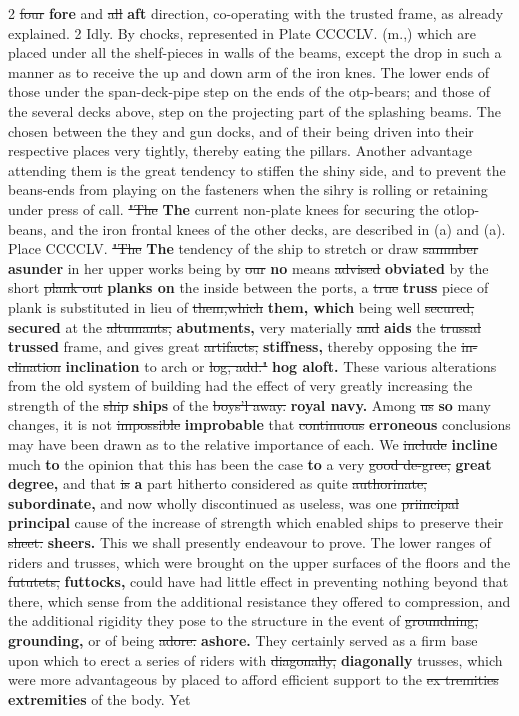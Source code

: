 \documentclass[10pt]{article}
\begin{document}
\begin{multicols}{2}
\sout{four} \textbf{fore} and \sout{all} \textbf{aft} direction, co-operating with the trusted frame, as already explained. 2 Idly. By chocks, represented in Plate CCCCLV. (m.,) which are placed under all the shelf-pieces in walls of the beams, except the drop in such a manner as to receive the up and down arm of the iron knes. The lower ends of those under the span-deck-pipe step on the ends of the otp-bears; and those of the several decks above, step on the projecting part of the splashing beams. The chosen between the they and gun docks, and of their being driven into their respective places very tightly, thereby eating the pillars. Another advantage attending them is the great tendency to stiffen the shiny side, and to prevent the beans-ends from playing on the fasteners when the sihry is rolling or retaining under press of call. \sout{"The} \textbf{The} current non-plate knees for securing the otlop-beans, and the iron frontal knees of the other decks, are described in (a) and (a). Place CCCCLV. \sout{"The} \textbf{The} tendency of the ship to stretch or draw \sout{sammber} \textbf{asunder} in her upper works being by \sout{our} \textbf{no} means \sout{advised} \textbf{obviated} by the short \sout{plank out} \textbf{planks on} the inside between the ports, a \sout{true} \textbf{truss} piece of plank is substituted in lieu of \sout{them,which} \textbf{them, which} being well \sout{secured,} \textbf{secured} at the \sout{altumants,} \textbf{abutments,} very materially \sout{and} \textbf{aids} the \sout{trussal} \textbf{trussed} frame, and gives great \sout{artifacts,} \textbf{stiffness,} thereby opposing the \sout{in-clination} \textbf{inclination} to arch or \sout{log, add."} \textbf{hog aloft.} These various alterations from the old system of building had the effect of very greatly increasing the strength of the \sout{ship} \textbf{ships} of the \sout{boys'l away.} \textbf{royal navy.} Among \sout{us} \textbf{so} many changes, it is not \sout{impossible} \textbf{improbable} that \sout{continuous} \textbf{erroneous} conclusions may have been drawn as to the relative importance of each. We \sout{include} \textbf{incline} much \textbf{to} the opinion that this has been the case \textbf{to} a very \sout{good de-gree,} \textbf{great degree,} and that \sout{is} \textbf{a} part hitherto considered as quite \sout{authorinate,} \textbf{subordinate,} and now wholly discontinued as useless, was one \sout{priincipal} \textbf{principal} cause of the increase of strength which enabled ships to preserve their \sout{sheet.} \textbf{sheers.} This we shall presently endeavour to prove. The lower ranges of riders and trusses, which were brought on the upper surfaces of the floors and the \sout{fututets,} \textbf{futtocks,} could have had little effect in preventing nothing beyond that there, which sense from the additional resistance they offered to compression, and the additional rigidity they pose to the structure in the event of \sout{groundning,} \textbf{grounding,} or of being \sout{adore.} \textbf{ashore.} They certainly served as a firm base upon which to erect a series of riders with \sout{diagonally,} \textbf{diagonally} trusses, which were more advantageous by placed to afford efficient support to the \sout{ex tremities} \textbf{extremities} of the body. Yet 
\end{multicols}
\end{document}
